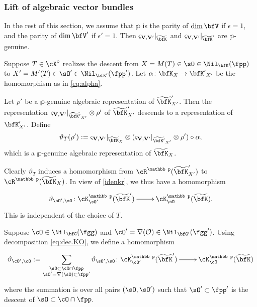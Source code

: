 \documentclass[12pt,a4paper]{amsart}
\newcommand{\CO}{{\mathcal {O}}}
\newcommand{\wt}{\widetilde}
\def\DD{\nabla}
\numberwithin{equation}{section}
\theoremstyle{remark}
\def\wtbfK{\widetilde{\bfK}}
\def\MMP{M}
\def\Xo{\cX^\circ}
\def\dliftv{\vartheta}
\def\mktvvp{\varsigma_{{\bf V},{\bf V}'}}
\begin{document}
  \subsubsection{Lift of algebraic vector bundles}\label{sec:lift.AC}

  In the rest of this section, we assume that $\mathbb p$ is the parity of $\dim \bfV$ if $\epsilon=1$, and  the parity of $\dim \bfV'$ if $\epsilon'=1$.  Then $\mktvvp|_{\wtbfK}$ and
  $\mktvvp|_{\wtbfK'}$ are $\mathbb p$-genuine.

  Suppose $T\in \Xo$ realizes the descent from  $X = \MMP(T)\in \sO\in \Nil_{\bfK}(\fpp)$
  to
  $X' = \MMP'(T)\in \sO'\in \Nil_{\bfK'}(\fpp')$. Let  $\alpha\colon
  {\bfK}_X\rightarrow {\bfK'}_{X'}$ be the homomorphism as in \cref{eq:alpha}.

  Let $\rho'$ be a $\mathbb p$-genuine algebraic representation  of $\wtbfK'_{X'}$. Then  the representation $\mktvvp|_{\wt{\bfK'}_{X'}}\otimes \rho'$ of $\wtbfK'_{X'}$ descends  to a representation of $\bfK'_{X'}$.  Define
  \begin{equation}\label{defn:tlift.rho}
    \dliftv_{T}(\rho'):= \mktvvp|_{\wt{\bfK}_{X}} \otimes (\mktvvp|_{\wt{\bfK'}_{X'}}\otimes \rho')\circ \alpha,
  \end{equation}
  which  is a $\mathbb p$-genuine algebraic representation of $\wt{\bfK}_{X}$.

  Clearly $\dliftv_T$ induces a homomorphism from
  $\cR^{\mathbb p}(\wtbfK'_{X'})$ to $\cR^{\mathbb p}(\wtbfK_X)$.
  In view of \eqref{idenkr}, we thus have a homomorphism
  \begin{equation}\label{defn:DS.ch}
    \xymatrix{
      \dliftv_{\sO',\sO}\colon \cK^{\mathbb p}_{\sO'}(\wt{\bfK}') \ar[r]&
      \cK^{\mathbb p}_{\sO}(\wt{\bfK}).
    }
  \end{equation}
  This is independent of the choice of $T$.



  Suppose $\cO\in\Nil_{\bfG}(\fgg)$ and $\cO'=\DD(\CO)\in \Nil_{\bfG'}(\fgg')$. Using decomposition \cref{eq:dec.KO}, we define a homomorphism
  \begin{equation}\label{eq:DS.chc}
    \xymatrix{
      \dliftv_{\cO',\cO} := \displaystyle\sum_{\substack{\sO\subset \cO\cap \fpp\\ \sO' =
          \DD(\sO) \subset \fpp'}}\dliftv_{\sO',\sO}\colon \cK^{\mathbb p}_{\cO'}(\wt{\bfK}') \ar[r]&
      \cK^{\mathbb p}_{\cO}(\wt{\bfK})
    }
  \end{equation}
  where the summation
  is over all pairs  $(\sO, \sO')$ such that $\sO'\subset \fpp'$ is the descent of
  $\sO\subset \cO\cap \fpp$.
\end{document}
